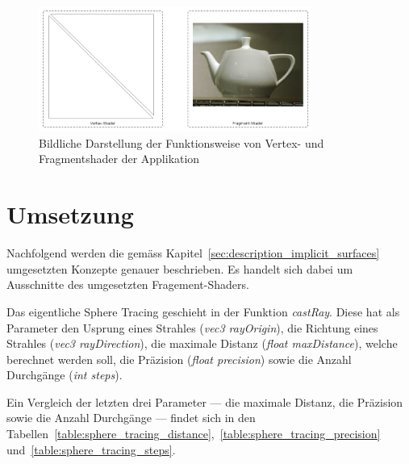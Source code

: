 \begin{figure}[H]
    \centering
    \includegraphics[width=0.8\textwidth]{img/prototype_shaders.png}
    \caption{Bildliche Darstellung der Funktionsweise von Vertex- und
        Fragmentshader der Applikation\protect\footnotemark}\label{fig:prototype_shaders}
\end{figure}

\section{Umsetzung}
\label{sec:realization}

Nachfolgend werden die gemäss Kapitel~\ref{sec:description_implicit_surfaces}
umgesetzten Konzepte genauer beschrieben. Es handelt sich dabei um Ausschnitte
des umgesetzten Fragement-Shaders.

Das eigentliche Sphere Tracing geschieht in der Funktion
\textit{castRay}.  Diese hat als Parameter den Usprung eines Strahles
(\textit{vec3 rayOrigin}), die Richtung eines Strahles (\textit{vec3
    rayDirection}), die maximale Distanz (\textit{float maxDistance}),
welche berechnet werden soll, die Präzision (\textit{float precision})
sowie die Anzahl Durchgänge (\textit{int steps}).

Ein Vergleich der letzten drei Parameter --- die maximale Distanz, die
Präzision sowie die Anzahl Durchgänge --- findet sich in den
Tabellen~\ref{table:sphere_tracing_distance},~\ref{table:sphere_tracing_precision}
und~\ref{table:sphere_tracing_steps}.

